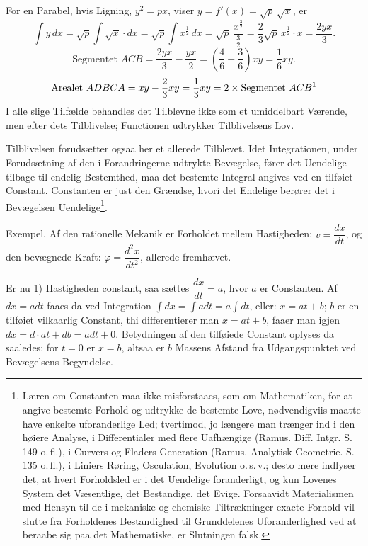 \documentclass[12pt]{book}
\newcommand{\opage}[1]{\marginnote{\footnotesize\textit{[#1]}}}
\begin{document}
For en Parabel, hvis Ligning, $y^{2} = px$, viser
$y = f'(x) = \sqrt{p}\,\sqrt{x}$, er
\[
\int y\,dx = \sqrt{p}\int \sqrt{x}\cdot dx = \sqrt{p}\int x^{\frac12}\,dx
  = \sqrt{p}\,\frac{x^{\frac{3}{2}}}{\frac{3}{2}}
  = \frac{2}{3}\sqrt{p}\,x^{\frac12}\cdot x = \frac{2yx}{3}.
\]
\[
\text{Segmentet } ACB = \frac{2yx}{3} - \frac{yx}{2}
  = \left(\frac{4}{6} - \frac{3}{6}\right)xy = \frac{1}{6}xy.
\]
\[
\text{Arealet } ADBCA = xy - \frac{2}{3}xy = \frac{1}{3}xy
  = 2\times \text{Segmentet } ACB\text{\footnotemark}
\]
I alle slige Tilfælde behandles det Tilblevne ikke som et umiddelbart
Værende, men efter dets Tilblivelse; Functionen udtrykker Tilblivelsens
Lov.

Tilblivelsen forudsætter ogsaa her et allerede Tilblevet. Idet
Integrationen, under Forudsætning af den i Forandringerne udtrykte
Bevægelse, fører det Uendelige tilbage til endelig Bestemthed, maa det
bestemte Integral angives ved en tilføiet Constant. Constanten er just
den Grændse, hvori det Endelige berører det i Bevægelsen
Uendelige\footnote{Læren om Constanten maa ikke misforstaaes, som om
Mathematiken, for at angive bestemte Forhold og udtrykke de bestemte
Love, nødvendigviis maatte have enkelte uforanderlige Led; tvertimod,
jo længere man trænger ind i den høiere Analyse, i Differentialer med
flere Uafhængige (Ramus. Diff. Intgr. S.\,149 o.\,fl.), i Curvers og
Fladers Generation (Ramus. Analytisk Geometrie. S.\,135 o.\,fl.), i
Liniers Røring, Osculation, Evolution o.\,s.\,v.; desto mere indlyser
det, at hvert Forholdsled er i det Uendelige foranderligt, og kun
Lovenes System det Væsentlige, det Bestandige, det Evige. Forsaavidt
Materialismen med Hensyn til de i mekaniske og chemiske Tiltrækninger
exacte Forhold vil slutte fra Forholdenes Bestandighed til
Grunddelenes Uforanderlighed ved at beraabe sig paa det Mathematiske,
er Slutningen falsk.}.

\opage{81} Exempel. Af den rationelle Mekanik er Forholdet mellem Hastigheden:
$v = \dfrac{dx}{dt}$, og den bevægnede Kraft:
$\varphi = \dfrac{d^{2}x}{dt^{2}}$, allerede fremhævet.

Er nu 1) Hastigheden constant, saa sættes $\dfrac{dx}{dt} = a$, hvor
$a$ er Constanten. Af $dx = adt$ faaes da ved Integration
$\int dx = \int adt = a\int dt$, eller: $x = at + b$; $b$ er en
tilføiet vilkaarlig Constant, thi differentierer man $x = at + b$,
faaer man igjen $dx = d\cdot at + db = adt + 0$. Betydningen af den
tilføiede Constant oplyses da saaledes: for $t = 0$ er $x = b$, altsaa
er $b$ Massens Afstand fra Udgangspunktet ved Bevægelsens Begyndelse.
\end{document}
